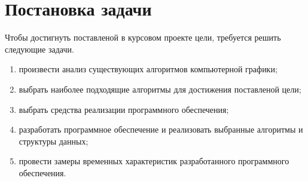 \chapter*{Постановка задачи}

Чтобы достигнуть поставленой в курсовом проекте цели, требуется решить следующие задачи.
\begin{enumerate}[label=---]
    \item произвести анализ существующих алгоритмов компьютерной графики;
    \item выбрать наиболее подходящие алгоритмы для достижения поставленой цели;
    \item выбрать средства реализации программного обеспечения;
    \item разработать программное обеспечение и реализовать выбранные алгоритмы и структуры данных;
    \item провести замеры временных характеристик разработанного программного обеспечения.
\end{enumerate}